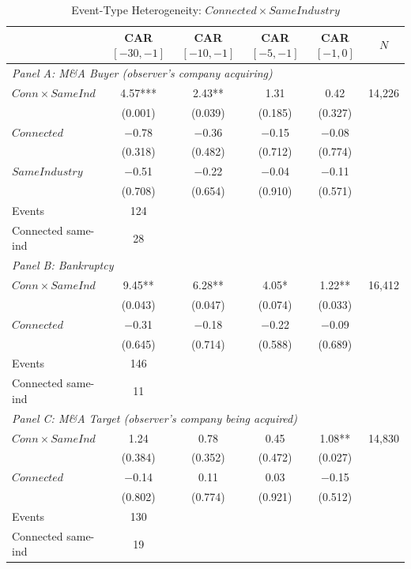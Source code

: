 \begin{table}[htbp]
\centering
\begin{threeparttable}
\caption{Event-Type Heterogeneity: $Connected \times SameIndustry$}
\label{tab:eventtype}
\small
\begin{tabular}{lccccc}
\toprule
 & CAR$[-30,-1]$ & CAR$[-10,-1]$ & CAR$[-5,-1]$ & CAR$[-1,0]$ & $N$ \\
\midrule
\multicolumn{6}{l}{\textit{Panel A: M\&A Buyer (observer's company acquiring)}} \\
\midrule
$Conn \times SameInd$ & 4.57*** & 2.43** & 1.31 & 0.42 & 14,226 \\
 & (0.001) & (0.039) & (0.185) & (0.327) & \\[0.2em]
$Connected$ & $-$0.78 & $-$0.36 & $-$0.15 & $-$0.08 & \\
 & (0.318) & (0.482) & (0.712) & (0.774) & \\[0.2em]
$SameIndustry$ & $-$0.51 & $-$0.22 & $-$0.04 & $-$0.11 & \\
 & (0.708) & (0.654) & (0.910) & (0.571) & \\[0.2em]
\quad Events & 124 &  &  &  & \\
\quad Connected same-ind & 28 &  &  &  & \\
\midrule
\multicolumn{6}{l}{\textit{Panel B: Bankruptcy}} \\
\midrule
$Conn \times SameInd$ & 9.45** & 6.28** & 4.05* & 1.22** & 16,412 \\
 & (0.043) & (0.047) & (0.074) & (0.033) & \\[0.2em]
$Connected$ & $-$0.31 & $-$0.18 & $-$0.22 & $-$0.09 & \\
 & (0.645) & (0.714) & (0.588) & (0.689) & \\[0.2em]
\quad Events & 146 &  &  &  & \\
\quad Connected same-ind & 11 &  &  &  & \\
\midrule
\multicolumn{6}{l}{\textit{Panel C: M\&A Target (observer's company being acquired)}} \\
\midrule
$Conn \times SameInd$ & 1.24 & 0.78 & 0.45 & 1.08** & 14,830 \\
 & (0.384) & (0.352) & (0.472) & (0.027) & \\[0.2em]
$Connected$ & $-$0.14 & 0.11 & 0.03 & $-$0.15 & \\
 & (0.802) & (0.774) & (0.921) & (0.512) & \\[0.2em]
\quad Events & 130 &  &  &  & \\
\quad Connected same-ind & 19 &  &  &  & \\

\end{tabular}
\end{threeparttable}
\end{table}
